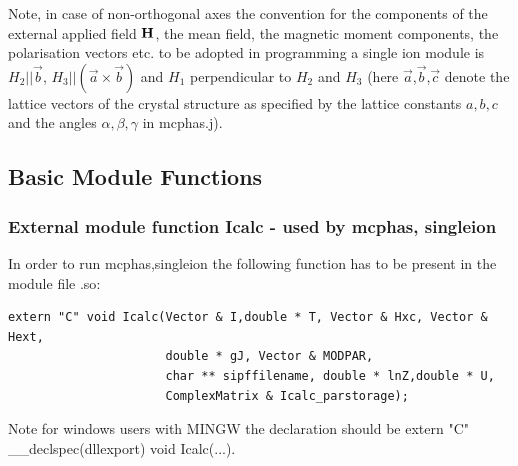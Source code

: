 \clearpage

Note, in case of non-orthogonal axes the convention for the components
of the external applied field $\mathbf H$, the mean field, the magnetic moment 
components, the polarisation vectors etc. to be adopted in programming a single ion module is
 $H_2||\vec b$, $H_3||(\vec a \times \vec b)$ and $H_1$ perpendicular to $H_2$ and $H_3$
(here $\vec a$,$\vec b$,$\vec c$ denote the lattice vectors of the crystal structure
as specified by the lattice constants $a,b,c$ and the angles $\alpha,\beta,\gamma$
 in {\prg mcphas.j}).



\subsection{Basic Module Functions}


\subsubsection{External module function {\prg Icalc} - used by {\prg mcphas},
{\prg singleion} }

In order to run {\prg mcphas},{\prg singleion}
 the following function has to be present in the module file {\prg *.so}:

\begin{verbatim}
extern "C" void Icalc(Vector & I,double * T, Vector & Hxc, Vector & Hext,
                      double * gJ, Vector & MODPAR,
                      char ** sipffilename, double * lnZ,double * U,
                      ComplexMatrix & Icalc_parstorage);
\end{verbatim}

Note for windows users with MINGW the declaration should be {\prg extern "C" \_\_declspec(dllexport) void %
Icalc(...)}.


